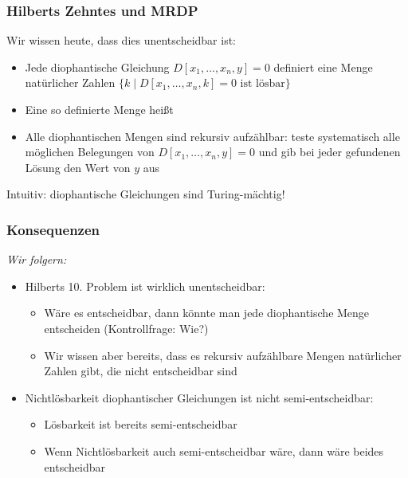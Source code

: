 \documentclass[aspectratio=1610,onlymath]{beamer}
\begin{document}
\begin{frame}\frametitle{Hilberts Zehntes und MRDP}

\pause

Wir wissen heute, dass dies unentscheidbar ist:
\begin{itemize}
\item Jede diophantische Gleichung $D[x_1,\ldots,x_n,y]= 0$ definiert eine Menge natürlicher Zahlen $\{k\mid D[x_1,\ldots,x_n,k]= 0 \text{ ist lösbar}\}$
\item Eine so definierte Menge heißt 
\item Alle diophantischen Mengen sind rekursiv aufzählbar: teste systematisch alle möglichen Belegungen von $D[x_1,\ldots,x_n,y]= 0$ und gib bei jeder gefundenen Lösung den Wert von $y$ aus
\end{itemize}\pause

{\tiny Intuitiv: diophantische Gleichungen sind Turing-mächtig!}

\end{frame}

\begin{frame}\frametitle{Konsequenzen}

\emph{Wir folgern:}
\begin{itemize}
\item \alert{Hilberts 10. Problem ist wirklich unentscheidbar:}
\begin{itemize}
\item Wäre es entscheidbar, dann könnte man jede diophantische Menge entscheiden (Kontrollfrage: Wie?)
\item Wir wissen aber bereits, dass es rekursiv aufzählbare Mengen natürlicher Zahlen gibt, die nicht entscheidbar sind
\end{itemize}\pause
\item \alert{Nichtlösbarkeit diophantischer Gleichungen ist nicht semi-entscheidbar:}
\begin{itemize}
\item Lösbarkeit ist bereits semi-entscheidbar
\item Wenn Nichtlösbarkeit auch semi-entscheidbar wäre, dann wäre beides entscheidbar
\end{itemize}
\end{itemize}

\end{frame}
\end{document}
